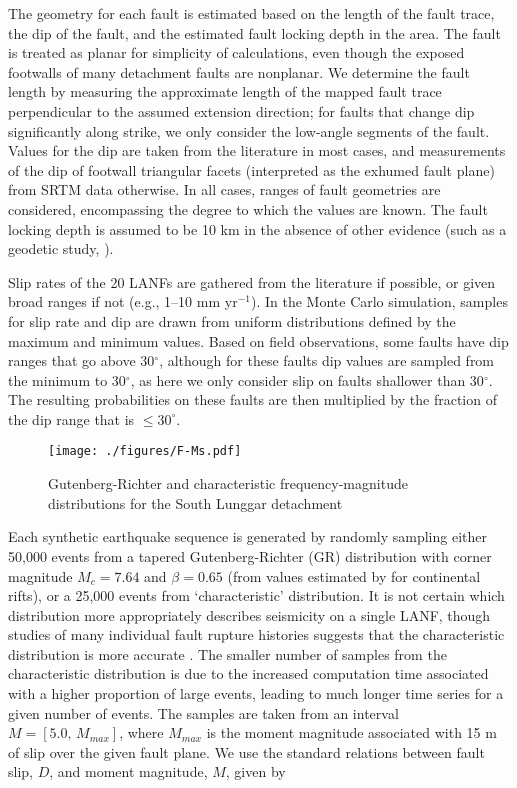 \documentclass[twocolumn,grl]{AGUTeX}
\begin{document}
\begin{article}
The geometry for each fault is estimated based on the length of the fault
trace, the dip of the fault, and the estimated fault locking depth in the area.
The fault is treated as planar for simplicity of calculations, even though the
exposed footwalls of many detachment faults are nonplanar.  We determine the
fault length by measuring the approximate length of the mapped fault trace
perpendicular to the assumed extension direction; for faults that change dip
significantly along strike, we only consider the low-angle segments of the
fault.  Values for the dip are taken from the literature in most cases, and
measurements of the dip of footwall triangular facets (interpreted as the
exhumed fault plane) from SRTM data otherwise. In all cases, ranges of fault
geometries are considered, encompassing the degree to which the values are
known. The fault locking depth is assumed to be 10 km in the absence of other
evidence (such as a geodetic study, \citep[e.g.,][]{hreinsdottir2009altotib}).

Slip rates of the 20 LANFs are gathered from the literature if possible, or
given broad ranges if not (e.g., 1--10 mm yr$^{-1}$).  In the Monte Carlo
simulation, samples for slip rate and dip are drawn from uniform distributions
defined by the maximum and minimum values.  Based on field observations, some
faults have dip ranges that go above 30$^\circ$, although for these faults dip
values are sampled from the minimum to 30$^\circ$, as here we only consider
slip on faults shallower than 30$^\circ$. The resulting probabilities on these
faults are then multiplied by the fraction of the dip range that is
$\le30^\circ$.

\begin{figure}[b]
\noindent\texttt{[image: ./figures/F-Ms.pdf]}
\caption{Gutenberg-Richter and characteristic frequency-magnitude 
 		 distributions for the South Lunggar detachment}
\label{fig:fms}
\end{figure}

Each synthetic earthquake sequence is generated by randomly sampling either
50,000 events from a tapered Gutenberg-Richter (GR) distribution with corner
magnitude $M_c = 7.64$ and $\beta = 0.65$ (from values estimated by
\citet{birdkagan2004f_m} for continental rifts), or a 25,000 events from
`characteristic' distribution. It is not certain which distribution more
appropriately describes seismicity on a single LANF, though studies of many
individual fault rupture histories suggests that the characteristic
distribution is more accurate \citep{hecker2013eqdist}.  The smaller number of
samples from the characteristic distribution is due to the increased
computation time associated with a higher proportion of large events, leading
to much longer time series for a given number of events.  The samples are taken
from an interval $M = [5.0, \, M_{max}]$, where $M_{max}$ is the moment
magnitude associated with 15 m of slip over the given fault plane.  We use the
standard relations between fault slip, $D$, and moment magnitude, $M$, given by


\end{article}
\end{document}

